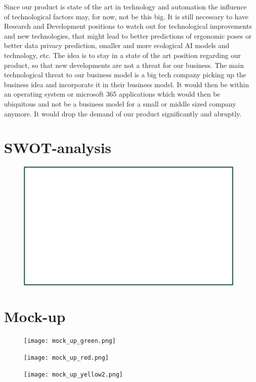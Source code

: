 Since our product is state of the art in technology and automation the influence of technological factors may, for now, not be this big. It is still necessary to have Research and Development positions to watch out for technological improvements and new technologies, that might lead to better predictions of ergonomic poses or better data privacy prediction, smaller and more ecological AI models and technology, etc. The idea is to stay in a state of the art position regarding our product, so that new developments are not a threat for our business.
The main technological threat to our business model is a big tech company picking up the business idea and incorporate it in their business model. It would then be within an operating system or microsoft 365 applications which would then be ubiquitous and not be a business model for a small or middle sized company anymore. It would drop the demand of our product significantly and abruptly. 

\section{SWOT-analysis}

\begin{figure}[h]
    \includegraphics[width=17.5cm]{SWOT_analysis.png}
\end{figure}

\section{Mock-up}

\begin{figure}[ht]
    \texttt{[image: mock\_up\_green.png]}
\end{figure}

\begin{figure}[ht]
    \texttt{[image: mock\_up\_red.png]}
\end{figure}

\begin{figure}[ht]
    \texttt{[image: mock\_up\_yellow2.png]}
\end{figure}

